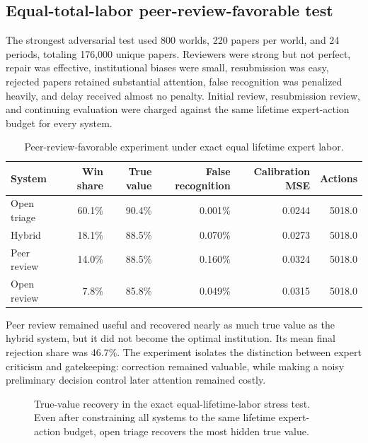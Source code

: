 \subsection{Equal-total-labor peer-review-favorable test}

The strongest adversarial test used 800 worlds, 220 papers per world, and 24 periods, totaling 176,000 unique papers. Reviewers were strong but not perfect, repair was effective, institutional biases were small, resubmission was easy, rejected papers retained substantial attention, false recognition was penalized heavily, and delay received almost no penalty. Initial review, resubmission review, and continuing evaluation were charged against the same lifetime expert-action budget for every system.

\begin{table}[ht]
\centering
\caption{Peer-review-favorable experiment under exact equal lifetime expert labor.}
\label{tab:equalbudget}
\small
\begin{tabular}{lrrrrr}
\toprule
System & Win share & True value & False recognition & Calibration MSE & Actions\\
\midrule
Open triage & 60.1\% & 90.4\% & 0.001\% & 0.0244 & 5018.0\\
Hybrid & 18.1\% & 88.5\% & 0.070\% & 0.0273 & 5018.0\\
Peer review & 14.0\% & 88.5\% & 0.160\% & 0.0324 & 5018.0\\
Open review & 7.8\% & 85.8\% & 0.049\% & 0.0315 & 5018.0\\
\bottomrule
\end{tabular}
\end{table}

Peer review remained useful and recovered nearly as much true value as the hybrid system, but it did not become the optimal institution. Its mean final rejection share was 46.7\%. The experiment isolates the distinction between expert criticism and gatekeeping: correction remained valuable, while making a noisy preliminary decision control later attention remained costly.


\begin{figure}[ht]
\centering
{}
\caption{True-value recovery in the exact equal-lifetime-labor stress test. Even after constraining all systems to the same lifetime expert-action budget, open triage recovers the most hidden true value.}
\label{fig:equalbudget_truevalue}
\end{figure}

